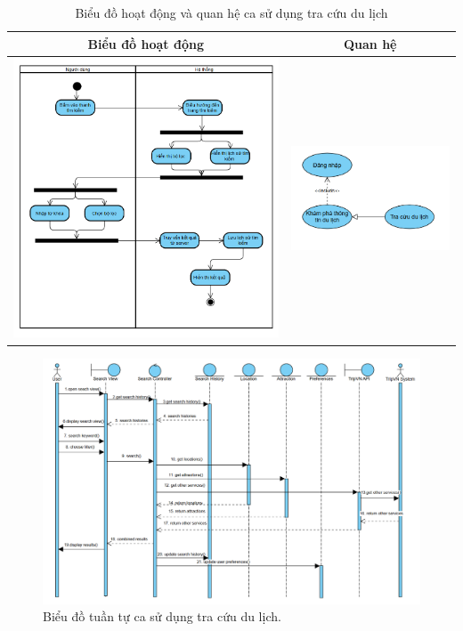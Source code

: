 \begin{table}[H] %
    \centering
    \caption{Biểu đồ hoạt động và quan hệ ca sử dụng tra cứu du lịch} %
    \label{tab:uc_search_diagrams} %
    \begin{tabular}{| c | c |}
        \hline
        \textbf{Biểu đồ hoạt động} & \textbf{Quan hệ} \\
        \hline
        \includegraphics[width=0.5\linewidth]{figures/c3/3-3-5-ad.png}
        &
        \includegraphics[width=0.45\linewidth]{figures/c3/3-3-5-rd.png} \\
        \hline
    \end{tabular}
\end{table}

\begin{figure}[H]
    \centering
    \includegraphics[width=1\textwidth]{figures/c3/3-3-5-sd.png} %
    \caption{Biểu đồ tuần tự ca sử dụng tra cứu du lịch.}
    \label{fig:3-3-5-sequence-diagram}
\end{figure}
